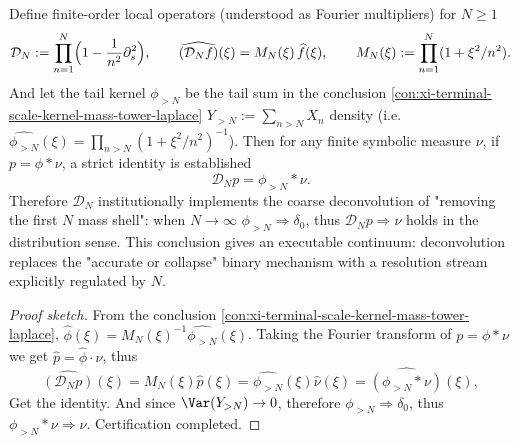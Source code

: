 \begin{conclusion}\label{con:xi-terminal-scale-kernel-partial-deconvolution-resolution}
Define finite-order local operators (understood as Fourier multipliers) for \(N\ge 1\)
\[
\mathcal D_N:=\prod_{n=1}^{N}\Bigl(1-\frac{1}{n^2}\partial_s^2\Bigr),
\qquad
\widehat{(\mathcal D_N f)}(\xi)=M_N(\xi)\,\widehat f(\xi),
\qquad
M_N(\xi):=\prod_{n=1}^{N}(1+\xi^{2}/n^{2}).
\]
And let the tail kernel \(\phi_{>N}\) be the tail sum in the conclusion \ref{con:xi-terminal-scale-kernel-mass-tower-laplace}
\(
Y_{>N}:=\sum_{n>N}X_n
\)
density (i.e. \(\widehat{\phi_{>N}}(\xi)=\prod_{n>N}(1+\xi^{2}/n^{2})^{-1}\)).
Then for any finite symbolic measure \(\nu\), if \(p=\phi*\nu\), a strict identity is established
\[
\boxed{\;
\mathcal D_N p=\phi_{>N}*\nu.\;}
\]
Therefore \(\mathcal D_N\) institutionally implements the coarse deconvolution of "removing the first \(N\) mass shell": when \(N\to\infty\) \(\phi_{>N}\Rightarrow\delta_0\), thus \(\mathcal D_N p\Rightarrow \nu\) holds in the distribution sense.
This conclusion gives an executable continuum: deconvolution replaces the "accurate or collapse" binary mechanism with a resolution stream explicitly regulated by \(N\).
\end{conclusion}
\begin{proof}[Proof sketch]
From the conclusion \ref{con:xi-terminal-scale-kernel-mass-tower-laplace}, \(\widehat\phi(\xi)=M_N(\xi)^{-1}\widehat{\phi_{>N}}(\xi)\).
Taking the Fourier transform of \(p=\phi*\nu\) we get \(\widehat p=\widehat\phi\cdot\widehat\nu\), thus
\[
\widehat{(\mathcal D_N p)}(\xi)=M_N(\xi)\widehat p(\xi)=\widehat{\phi_{>N}}(\xi)\widehat\nu(\xi)=\widehat{(\phi_{>N}*\nu)}(\xi),
\]
Get the identity.
And since \(\Var(Y_{>N})\to 0\), therefore \(\phi_{>N}\Rightarrow\delta_0\), thus \(\phi_{>N}*\nu\Rightarrow\nu\). Certification completed.
\end{proof}

